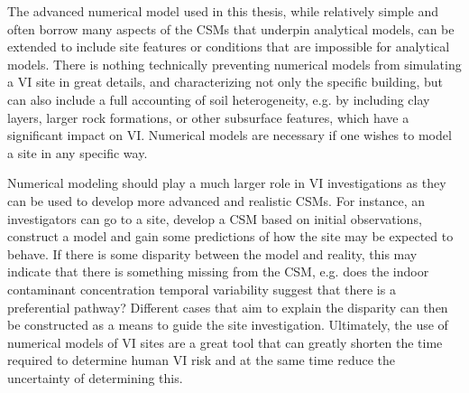 The advanced numerical model used in this thesis, while relatively simple and often borrow many aspects of the CSMs that underpin analytical models, can be extended to include site features or conditions that are impossible for analytical models.
There is nothing technically preventing numerical models from simulating a VI site in great details, and characterizing not only the specific building, but can also include a full accounting of soil heterogeneity, e.g. by including clay layers, larger rock formations, or other subsurface features, which have a significant impact on VI.
Numerical models are necessary if one wishes to model a site in any specific way.\par

Numerical modeling should play a much larger role in VI investigations as they can be used to develop more advanced and realistic CSMs.
For instance, an investigators can go to a site, develop a CSM based on initial observations, construct a model and gain some predictions of how the site may be expected to behave.
If there is some disparity between the model and reality, this may indicate that there is something missing from the CSM, e.g. does the indoor contaminant concentration temporal variability suggest that there is a preferential pathway?
Different cases that aim to explain the disparity can then be constructed as a means to guide the site investigation.
Ultimately, the use of numerical models of VI sites are a great tool that can greatly shorten the time required to determine human VI risk and at the same time reduce the uncertainty of determining this.\par
